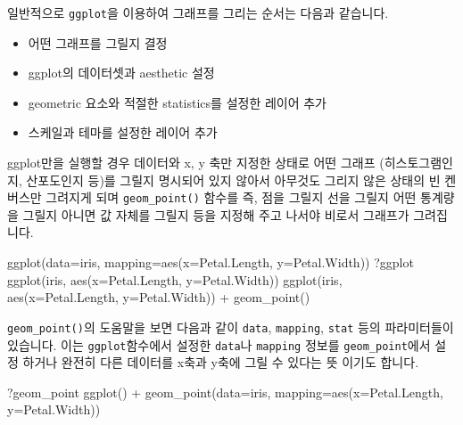 \documentclass[
]{book}
\newenvironment{Shaded}{\begin{snugshade}}{\end{snugshade}}
\newcommand{\AttributeTok}[1]{\textcolor[rgb]{0.77,0.63,0.00}{#1}}
\newcommand{\FunctionTok}[1]{\textcolor[rgb]{0.00,0.00,0.00}{#1}}
\newcommand{\NormalTok}[1]{#1}
\newcommand{\SpecialCharTok}[1]{\textcolor[rgb]{0.00,0.00,0.00}{#1}}
\providecommand{\tightlist}{%
  \setlength{\itemsep}{0pt}\setlength{\parskip}{0pt}}
\begin{document}
일반적으로 \texttt{ggplot}을 이용하여 그래프를 그리는 순서는 다음과 같습니다.

\begin{itemize}
\tightlist
\item
  어떤 그래프를 그릴지 결정
\item
  ggplot의 데이터셋과 aesthetic 설정
\item
  geometric 요소와 적절한 statistics를 설정한 레이어 추가
\item
  스케일과 테마를 설정한 레이어 추가
\end{itemize}

ggplot만을 실행할 경우 데이터와 x, y 축만 지정한 상태로 어떤 그래프 (히스토그램인지, 산포도인지 등)를 그릴지 명시되어 있지 않아서 아무것도 그리지 않은 상태의 빈 켄버스만 그려지게 되며 \texttt{geom\_point()} 함수를 즉, 점을 그릴지 선을 그릴지 어떤 통계량을 그릴지 아니면 값 자체를 그릴지 등을 지정해 주고 나서야 비로서 그래프가 그려집니다.

\begin{Shaded}
\begin{Highlighting}[]
\FunctionTok{ggplot}\NormalTok{(}\AttributeTok{data=}\NormalTok{iris, }\AttributeTok{mapping=}\FunctionTok{aes}\NormalTok{(}\AttributeTok{x=}\NormalTok{Petal.Length, }\AttributeTok{y=}\NormalTok{Petal.Width))}
\NormalTok{?ggplot}
\FunctionTok{ggplot}\NormalTok{(iris, }\FunctionTok{aes}\NormalTok{(}\AttributeTok{x=}\NormalTok{Petal.Length, }\AttributeTok{y=}\NormalTok{Petal.Width))}
\FunctionTok{ggplot}\NormalTok{(iris, }\FunctionTok{aes}\NormalTok{(}\AttributeTok{x=}\NormalTok{Petal.Length, }\AttributeTok{y=}\NormalTok{Petal.Width)) }\SpecialCharTok{+} \FunctionTok{geom\_point}\NormalTok{()}
\end{Highlighting}
\end{Shaded}

\texttt{geom\_point()}의 도움말을 보면 다음과 같이 \texttt{data}, \texttt{mapping}, \texttt{stat} 등의 파라미터들이 있습니다. 이는 \texttt{ggplot}함수에서 설정한 \texttt{data}나 \texttt{mapping} 정보를 \texttt{geom\_point}에서 설정 하거나 완전히 다른 데이터를 x축과 y축에 그릴 수 있다는 뜻 이기도 합니다.

\begin{Shaded}
\begin{Highlighting}[]
\NormalTok{?geom\_point}
\FunctionTok{ggplot}\NormalTok{() }\SpecialCharTok{+} 
  \FunctionTok{geom\_point}\NormalTok{(}\AttributeTok{data=}\NormalTok{iris, }\AttributeTok{mapping=}\FunctionTok{aes}\NormalTok{(}\AttributeTok{x=}\NormalTok{Petal.Length, }\AttributeTok{y=}\NormalTok{Petal.Width)) }
\end{Highlighting}
\end{Shaded}
\end{document}
